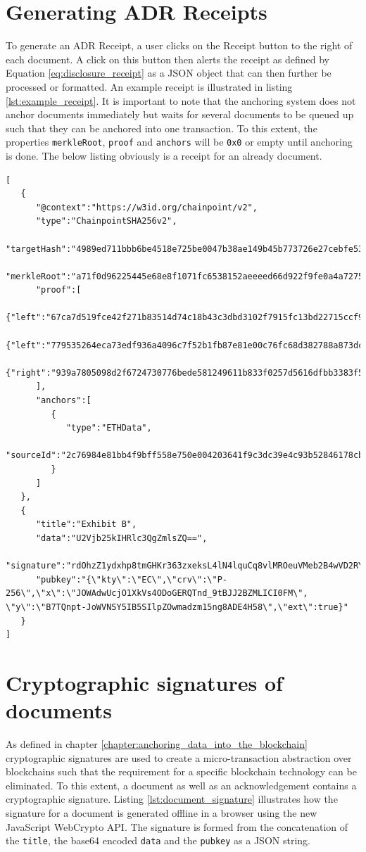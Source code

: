 \documentclass[12pt,msc,a4paper,oneside]{ucl_thesis}
\begin{document}
\section{Generating ADR Receipts}
To generate an ADR Receipt, a user clicks on the Receipt button to the right of each document. A click on this button then alerts the receipt as defined by Equation \ref{eq:disclosure_receipt} as a JSON object that can then further be processed or formatted. An example receipt is illustrated in listing \ref{lst:example_receipt}. It is important to note that the anchoring system does not anchor documents immediately but waits for several documents to be queued up such that they can be anchored into one transaction. To this extent, the properties \texttt{merkleRoot}, \texttt{proof} and \texttt{anchors} will be \texttt{0x0} or empty until anchoring is done. The below listing obviously is a receipt for an already document.
\begin{Code}
\begin{lstlisting}[style=adrReceipt, caption=Example ADR Receipt, label=lst:example_receipt]
[
   {
      "@context":"https://w3id.org/chainpoint/v2",
      "type":"ChainpointSHA256v2",
      "targetHash":"4989ed711bbb6be4518e725be0047b38ae149b45b773726e27cebfe5347b89d9",
      "merkleRoot":"a71f0d96225445e68e8f1071fc6538152aeeeed66d922f9fe0a4a7275f157b26",
      "proof":[
         {"left":"67ca7d519fce42f271b83514d74c18b43c3dbd3102f7915fc13bd22715ccf963"},
         {"left":"779535264eca73edf936a4096c7f52b1fb87e81e00c76fc68d382788a873dc3c"},
         {"right":"939a7805098d2f6724730776bede581249611b833f0257d5616dfbb3383f50d7"}
      ],
      "anchors":[
         {
            "type":"ETHData",
            "sourceId":"2c76984e81bb4f9bff558e750e004203641f9c3dc39e4c93b52846178cbd9d4a"
         }
      ]
   },
   {
      "title":"Exhibit B",
      "data":"U2Vjb25kIHRlc3QgZmlsZQ==",
      "signature":"rdOhzZ1ydxhp8tmGHKr363zxeksL4lN4lquCq8vlMROeuVMeb2B4wVD2RYB1K/Qbk1AorIf+/UoJAAiP76/cWA==",
      "pubkey":"{\"kty\":\"EC\",\"crv\":\"P-256\",\"x\":\"JOWAdwUcjO1XkVs4ODoGERQTnd_9tBJJ2BZMLICI0FM\", \"y\":\"B7TQnpt-JoWVNSY5IB5SIlpZOwmadzm15ng8ADE4H58\",\"ext\":true}"
   }
]
\end{lstlisting}
\end{Code}

\section{Cryptographic signatures of documents}
As defined in chapter \ref{chapter:anchoring_data_into_the_blockchain} cryptographic signatures are used to create a micro-transaction abstraction over blockchains such that the requirement for a specific blockchain technology can be eliminated. To this extent, a document as well as an acknowledgement contains a cryptographic signature. Listing \ref{lst:document_signature} illustrates how the signature for a document is generated offline in a browser using the new JavaScript WebCrypto API. The signature is formed from the concatenation of the \texttt{title}, the base64 encoded \texttt{data} and the \texttt{pubkey} as a JSON string.
\end{document}
